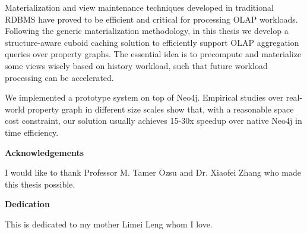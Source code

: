 Materialization and view maintenance techniques developed in traditional RDBMS have proved to be efficient and critical for processing OLAP workloads. Following the generic materialization methodology, in this thesis we develop a structure-aware cuboid caching solution to efficiently support OLAP aggregation queries over property graphs. The essential idea is to precompute and materialize some views wisely based on history workload, such that future workload processing can be accelerated. %

We implemented a prototype system on top of Neo4j. Empirical studies over real-world property graph in different size scales show that, with a reasonable space cost constraint, our solution usually achieves 15-30x speedup over native Neo4j in time efficiency.



\cleardoublepage


\begin{center}\textbf{Acknowledgements}\end{center}

I would like to thank Professor M. Tamer {$\ddot{\mbox{O}}$}zsu and Dr. Xiaofei Zhang who made this thesis possible.
\cleardoublepage


\begin{center}\textbf{Dedication}\end{center}

This is dedicated to my mother Limei Leng whom I love.
\cleardoublepage

\renewcommand\contentsname{Table of Contents}
\tableofcontents
\cleardoublepage
{}    %

\listoftables
\cleardoublepage
{}		%

\listoffigures
\cleardoublepage
{}		%

\printglossaries
\cleardoublepage
{}		%


